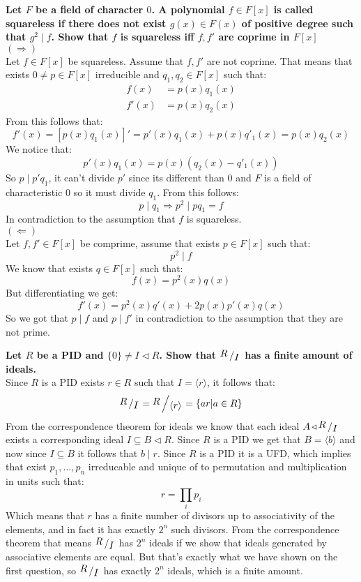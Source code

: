 \documentclass{article}
\theoremstyle{plain}
\DeclareMathOperator{\idealin}{\triangleleft}
\newcommand{\bigslant}[2]
{{\raisebox{.2em}{$#1$}\left/\raisebox{-.2em}{$#2$}\right.}}
\begin{document}
	\textbf{
	Let $F$ be a field of character $0$. A polynomial $f\in F[x]$ is called 
	squareless if there does not exist $g(x)\in F(x)$ of positive degree such 
	that $g^2\mid f$. Show that $f$ is squareless iff $f,f'$ are coprime in 
	$F[x]$} \\
	\underline{$(\Rightarrow)$} \\
	Let $f\in F[x]$ be squareless. Assume that $f,f'$ are not coprime.
	That means that exists $0\neq p\in F[x]$ irreducible and 
	$q_1,q_2\in F[x]$ such that:
	\begin{align*}
		f(x)  &= p(x)q_1(x) \\
		f'(x) &= p(x)q_2(x)
	\end{align*}
	From this follows that:
	\[
		f'(x) = [p(x)q_1(x)]' = p'(x)q_1(x) + p(x)q'_1(x) = p(x)q_2(x)
	\]
	We notice that:
	\[
		p'(x)q_1(x) = p(x)\left(q_2(x)-q'_1(x)\right)
	\]
	So $p \mid p'q_1$, it can't divide $p'$ since its different than $0$
	and $F$ is a field of characteristic $0$ so it must divide $q_1$.
	From this follows:
	\[
		p \mid q_1 \Rightarrow p^2 \mid pq_1 = f
	\]
	In contradiction to the assumption that $f$ is squareless. \\
	\underline{$(\Leftarrow)$} \\
	Let $f,f'\in F[x]$ be comprime, assume that exists $p\in F[x]$ such
	that:
	\[
		p^2 \mid f
	\]
	We know that exists $q\in F[x]$ such that:
	\[
		f(x) = p^2(x)q(x)
	\]
	But differentiating we get:
	\[
		f'(x) = p^2(x)q'(x) + 2p(x)p'(x)q(x)
	\]
	So we got that $p \mid f$ and $p \mid f'$ in contradiction to the 
	assumption that they are not prime.
	
	\newpage
	
	\textbf{Let $R$ be a PID and $\{0\}\neq I\idealin R$. Show that 
	$\bigslant{R}{I}$ has a finite amount of ideals.} \\
	Since $R$ is a PID exists $r\in R$ such that $I = \langle r \rangle$,
	it follows that:
	\[
		\bigslant{R}{I} = \bigslant{R}{\langle r \rangle} = 
		\{
			ar \vert a\in R
		\}
	\]
	From the correspondence theorem for ideals we know that each ideal
	$A \idealin \bigslant{R}{I}$ exists a corresponding ideal 
	$I \subseteq B \idealin R$. Since $R$ is a PID we get that 
	$B = \langle b \rangle$ and now since $I\subseteq B$ it follows that
	$b \mid r$. Since $R$ is a PID it is a UFD, which implies that exist
	$p_1,\dots,p_n$ irreducable and unique of to permutation
	and multiplication in units such that:
	\[
		r = \prod_i{p_i}
	\]
	Which means that $r$ has a finite number of divisors up to associativity
	of the elements, and in fact it has exactly $2^n$ such divisors. From
	the correspondence theorem that means $\bigslant{R}{I}$ has $2^n$ ideals
	if we show that ideals generated by associative elements are equal. But
	that's exactly what we have shown on the first question, so 
	$\bigslant{R}{I}$ has exactly $2^n$ ideals, which is a finite amount.
	
\end{document}
